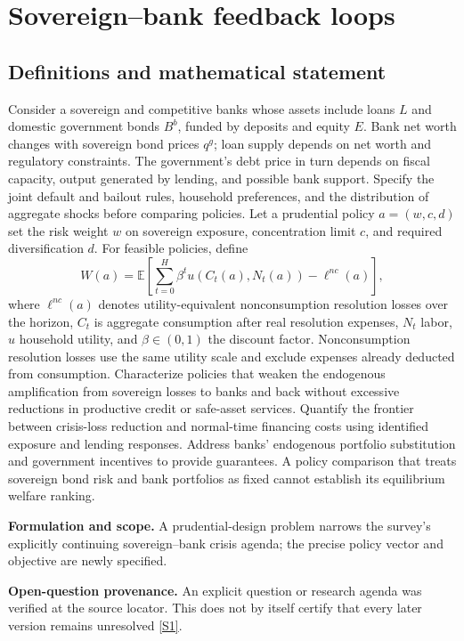 \documentclass[11pt]{article}
\newcommand{\sref}[2]{\hyperlink{source:#1:#2}{[S#2]}}
\begin{document}
\section*{Sovereign–bank feedback loops}\label{30007536}
\subsection{Definitions and mathematical statement}
Consider a sovereign and competitive banks whose assets include loans \(L\) and domestic government bonds \(B^b\), funded by deposits and equity \(E\). Bank net worth changes with sovereign bond prices \(q^g\); loan supply depends on net worth and regulatory constraints. The government’s debt price in turn depends on fiscal capacity, output generated by lending, and possible bank support. Specify the joint default and bailout rules, household preferences, and the distribution of aggregate shocks before comparing policies.
Let a prudential policy \(a=(w,c,d)\) set the risk weight \(w\) on sovereign exposure, concentration limit \(c\), and required diversification \(d\). For feasible policies, define
\[
W(a)=\mathbb{E}\left[\sum_{t=0}^{H}\beta^t u(C_t(a),N_t(a))-\ell^{nc}(a)\right],
\]
where \(\ell^{nc}(a)\) denotes utility-equivalent nonconsumption resolution losses over the horizon, \(C_t\) is aggregate consumption after real resolution expenses, \(N_t\) labor, \(u\) household utility, and \(\beta\in(0,1)\) the discount factor. Nonconsumption resolution losses use the same utility scale and exclude expenses already deducted from consumption. Characterize policies that weaken the endogenous amplification from sovereign losses to banks and back without excessive reductions in productive credit or safe-asset services. Quantify the frontier between crisis-loss reduction and normal-time financing costs using identified exposure and lending responses. Address banks’ endogenous portfolio substitution and government incentives to provide guarantees. A policy comparison that treats sovereign bond risk and bank portfolios as fixed cannot establish its equilibrium welfare ranking.

\par\textbf{Formulation and scope.} A prudential-design problem narrows the survey’s explicitly continuing sovereign–bank crisis agenda; the precise policy vector and objective are newly specified.

\par\textbf{Open-question provenance.} An explicit question or research agenda was verified at the source locator. This does not by itself certify that every later version remains unresolved \sref{30007536}{1}.
\end{document}
